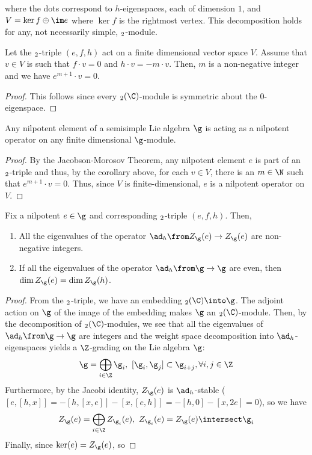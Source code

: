 where the dots correspond to \(h\)-eigenspaces, each of dimension
\(1\), and \(V = \ker f \oplus \im e\) where \(\ker f\) is the
rightmost vertex. This decomposition holds for any, not necessarily
simple, \(\sl_2\)-module.
\begin{cor}
  Let the \(\sl_2\)-triple \((e,f,h)\) act on a finite dimensional
  vector space \(V\). Assume that \(v \in V\) is such that \(f \cdot v
  = 0\) and \(h \cdot v = -m \cdot v\). Then, \(m\) is a non-negative
  integer and we have \(e^{m+1} \cdot v = 0\).
\end{cor}
\begin{proof}
  This follows since every \(\sl_2(\C)\)-module is symmetric about the
  \(0\)-eigenspace. 
\end{proof}
\begin{cor}
  Any nilpotent element of a semisimple Lie algebra \(\g\) is acting
  as a nilpotent operator on any finite dimensional \(\g\)-module.
\end{cor}
\begin{proof}
  By the Jacobson-Morosov Theorem, any nilpotent element \(e\) is part of an
  \(\sl_2\)-triple and thus, by the corollary above, for each \(v \in
  V\), there is an \(m
  \in \N\) such that \(e^{m+1} \cdot v
  = 0\). Thus, since \(V\) is finite-dimensional, \(e\) is a nilpotent
  operator on \(V\).
\end{proof}
\begin{cor}
  Fix a nilpotent \(e \in \g\) and corresponding \(\sl_2\)-triple
  \((e,f,h)\). Then,
  \begin{enumerate}
  \item All the eigenvalues of the operator \(\ad_h \from Z_\g(e) \to
    Z_\g(e)\) are non-negative integers.
  \item If all the eigenvalues of the operator \(\ad_h \from \g \to
    \g\) are even, then \(\dim Z_\g(e) = \dim Z_\g(h)\).
  \end{enumerate}
\end{cor}
\begin{proof}
  From the \(\sl_2\)-triple, we have an embedding \(\sl_2(\C) \into
  \g\). The adjoint action on \(\g\) of the image of the embedding
  makes \(\g\) an \(\sl_2(\C)\)-module. Then, by the decomposition of
  \(\sl_2(\C)\)-modules, we see that all the eigenvalues of \(\ad_h
  \from \g \to \g\) are integers and the weight space decomposition
  into \(\ad_h\)-eigenspaces yields a \(\Z\)-grading on the Lie
  algebra \(\g\): \[
    \g = \bigoplus_{i \in \Z} \g_i, \ [\g_i, \g_j] \subset \g_{i+j},
    \forall i, j \in \Z
  \]
  Furthermore, by the Jacobi identity, \(Z_\g(e)\) is
  \(\ad_h\)-stable (\([e,[h,x]] =
  -[h,[x,e]]-[x,[e,h]] = -[h,0]-[x,2e] = 0\)), so we have \[
    Z_\g(e) = \bigoplus_{i \in \Z} Z_{\g_i}(e), \ Z_{\g_i}(e) =
    Z_\g(e) \intersect \g_i
  \]
  Finally, since \(\ker(e) = Z_\g(e)\), so 
\end{proof}
